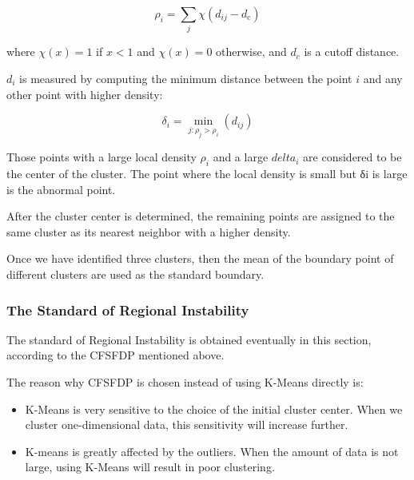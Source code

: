 \documentclass{mcmthesis}
\begin{document}
				\begin{equation}
				\rho _ { i } = \sum _ { j } \chi \left( d _ { i j } - d _ { \mathrm { c } } \right)
				\end{equation}
				
				where $\chi ( x ) = 1$ if $ x < 1 $ and $\chi ( x ) = 0$ otherwise, and $d_c$ is a cutoff distance. 
				
				$d_i$ is measured by computing the minimum distance between the point $i$ and any other point with higher density:
				
				\begin{equation}
				\delta _ { i } = \min _ { j : \rho _ { j } > \rho _ { i } } \left( d _ { i j } \right)
				\end{equation}
				
				Those points with a large local density $\rho _ { i }$ and a large $delta _ { i }$ are considered to be the center of the cluster. The point where the local density is small but δi is large is the abnormal point.
				
				After the cluster center is determined, the remaining points are assigned to the same cluster as its nearest neighbor with a higher density.
				
				Once we have identified three clusters, then the mean of the boundary point of different clusters are used as the standard boundary.
			
			\subsubsection{The Standard of Regional Instability}
			
				The standard of Regional Instability is obtained eventually in this section, according to the CFSFDP mentioned above. 
				
				The reason why CFSFDP is chosen instead of using K-Means directly is:
				
				\begin{itemize}
					
					\item K-Means is very sensitive to the choice of the initial cluster center. When we cluster one-dimensional data, this sensitivity will increase further.
					
					\item K-means is greatly affected by the outliers. When the amount of data is not large, using K-Means will result in poor clustering.
					
				\end{itemize}
				
\end{document}
